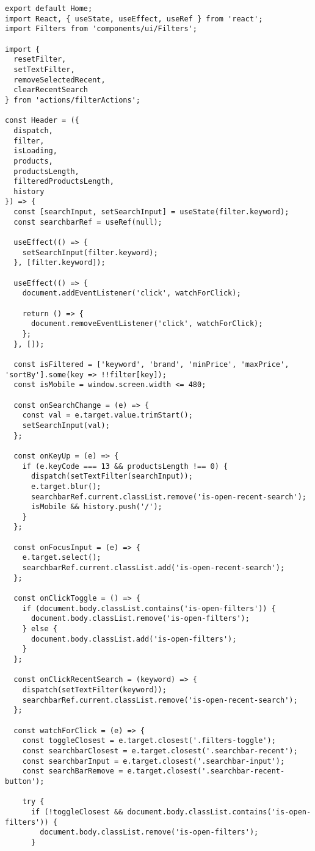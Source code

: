 \begin{lstlisting}
export default Home;
import React, { useState, useEffect, useRef } from 'react';
import Filters from 'components/ui/Filters';

import {
  resetFilter,
  setTextFilter,
  removeSelectedRecent,
  clearRecentSearch
} from 'actions/filterActions';

const Header = ({
  dispatch,
  filter,
  isLoading,
  products,
  productsLength,
  filteredProductsLength,
  history
}) => {
  const [searchInput, setSearchInput] = useState(filter.keyword);
  const searchbarRef = useRef(null);

  useEffect(() => {
    setSearchInput(filter.keyword);
  }, [filter.keyword]);

  useEffect(() => {
    document.addEventListener('click', watchForClick);

    return () => {
      document.removeEventListener('click', watchForClick);
    };
  }, []);

  const isFiltered = ['keyword', 'brand', 'minPrice', 'maxPrice', 'sortBy'].some(key => !!filter[key]);
  const isMobile = window.screen.width <= 480;

  const onSearchChange = (e) => {
    const val = e.target.value.trimStart();
    setSearchInput(val);
  };

  const onKeyUp = (e) => {
    if (e.keyCode === 13 && productsLength !== 0) {
      dispatch(setTextFilter(searchInput));
      e.target.blur();
      searchbarRef.current.classList.remove('is-open-recent-search');
      isMobile && history.push('/');
    }
  };

  const onFocusInput = (e) => {
    e.target.select();
    searchbarRef.current.classList.add('is-open-recent-search');
  };

  const onClickToggle = () => {
    if (document.body.classList.contains('is-open-filters')) {
      document.body.classList.remove('is-open-filters');
    } else {
      document.body.classList.add('is-open-filters');
    }
  };

  const onClickRecentSearch = (keyword) => {
    dispatch(setTextFilter(keyword));
    searchbarRef.current.classList.remove('is-open-recent-search');
  };

  const watchForClick = (e) => {
    const toggleClosest = e.target.closest('.filters-toggle');
    const searchbarClosest = e.target.closest('.searchbar-recent');
    const searchbarInput = e.target.closest('.searchbar-input');
    const searchBarRemove = e.target.closest('.searchbar-recent-button');

    try {
      if (!toggleClosest && document.body.classList.contains('is-open-filters')) {
        document.body.classList.remove('is-open-filters');
      }


\end{lstlisting}
